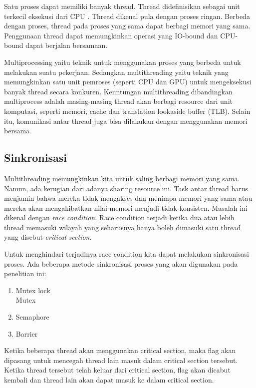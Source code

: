     Satu proses dapat memiliki banyak thread. Thread didefinisikan sebagai unit terkecil eksekusi dari CPU \citep{os}. Thread dikenal pula dengan proses ringan. Berbeda dengan proses, thread pada proses yang sama dapat berbagi memori yang sama. Penggunaan thread dapat memungkinkan operasi yang IO-bound dan CPU-bound dapat berjalan bersamaan.

    Multiprocessing yaitu teknik untuk menggunakan proses yang berbeda untuk melakukan suatu pekerjaan. Sedangkan multithreading yaitu teknik yang memungkinkan satu unit pemroses (seperti CPU dan GPU) untuk mengeksekusi banyak thread secara konkuren. Keuntungan multithreading dibandingkan multiprocess adalah masing-masing thread akan berbagi resource dari unit komputasi, seperti memori, cache dan translation lookaside buffer (TLB). Selain itu, komunikasi antar thread juga bisa dilakukan dengan menggunakan memori bersama. 

  \subsection{Sinkronisasi}

    Multithreading memungkinkan kita untuk saling berbagi memori yang sama. Namun, ada kerugian dari adanya sharing resource ini. Task antar thread harus menjamin bahwa mereka tidak mengakses dan menimpa memori yang sama atau mereka akan mengakibatkan nilai memori menjadi tidak konsisten. Masalah ini dikenal dengan \emph{race condition}. Race condition terjadi ketika dua atau lebih thread memasuki wilayah yang seharusnya hanya boleh dimasuki satu thread yang disebut \emph{critical section}. 

    Untuk menghindari terjadinya race condition kita dapat melakukan sinkronisasi proses. Ada beberapa metode sinkronisasi proses yang akan digunakan pada penelitian ini:

    \begin{enumerate}

    \item
    Mutex lock \\
    Mutex 

    \item
    Semaphore \\

    \item
    Barrier \\

    \end{enumerate}

 Ketika beberapa thread akan menggunakan critical section, maka flag akan dipasang untuk mencegah thread lain masuk dalam critical section tersebut. Ketika thread tersebut telah keluar dari critical section, flag akan dicabut kembali dan thread lain akan dapat masuk ke dalam critical section. 

